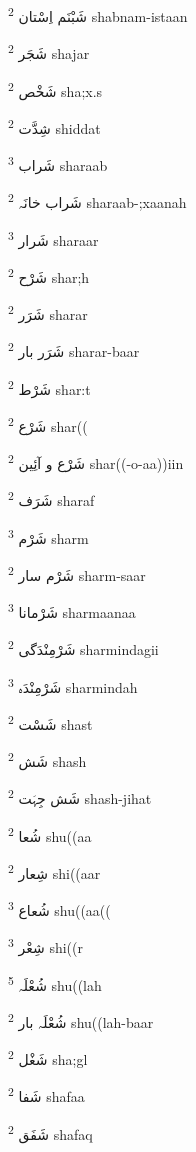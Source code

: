 \documentclass[12pt]{article}
\begin{document}
\begin{multicols}{5}
{\ur شَبْنَم اِسْتان}   \textsuperscript{2} shabnam-istaan

{\ur شَجَر}   \textsuperscript{2} shajar

{\ur شَخْص}   \textsuperscript{2} sha;x.s

{\ur شِدَّت}   \textsuperscript{2} shiddat

{\ur شَراب}   \textsuperscript{3} sharaab

{\ur شَراب خانَہ}   \textsuperscript{2} sharaab-;xaanah

{\ur شَرار}   \textsuperscript{3} sharaar

{\ur شَرْح}   \textsuperscript{2} shar;h

{\ur شَرَر}   \textsuperscript{2} sharar

{\ur شَرَر بار}   \textsuperscript{2} sharar-baar

{\ur شَرْط}   \textsuperscript{2} shar:t

{\ur شَرْع}   \textsuperscript{2} shar((

{\ur شَرْع و آئِین}   \textsuperscript{2} shar((-o-aa))iin

{\ur شَرَف}   \textsuperscript{2} sharaf

{\ur شَرْم}   \textsuperscript{3} sharm

{\ur شَرْم سار}   \textsuperscript{2} sharm-saar

{\ur شَرْمانا}   \textsuperscript{3} sharmaanaa

{\ur شَرْمِنْدَگی}   \textsuperscript{2} sharmindagii

{\ur شَرْمِنْدَہ}   \textsuperscript{3} sharmindah

{\ur شَسْت}   \textsuperscript{2} shast

{\ur شَش}   \textsuperscript{2} shash

{\ur شَش جِہَت}   \textsuperscript{2} shash-jihat

{\ur شُعا}   \textsuperscript{2} shu((aa

{\ur شِعار}   \textsuperscript{2} shi((aar

{\ur شُعاع}   \textsuperscript{3} shu((aa((

{\ur شِعْر}   \textsuperscript{3} shi((r

{\ur شُعْلَہ}   \textsuperscript{5} shu((lah

{\ur شُعْلَہ بار}   \textsuperscript{2} shu((lah-baar

{\ur شَغْل}   \textsuperscript{2} sha;gl

{\ur شَفا}   \textsuperscript{2} shafaa

{\ur شَفَق}   \textsuperscript{2} shafaq


\end{multicols}
\end{document}
